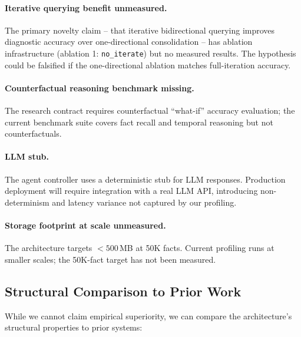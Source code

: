 \documentclass{article}
\begin{document}
\paragraph{Iterative querying benefit unmeasured.}
The primary novelty claim -- that iterative bidirectional querying improves
diagnostic accuracy over one-directional consolidation -- has ablation
infrastructure (ablation 1: \texttt{no\_iterate}) but no measured results. The
hypothesis could be falsified if the one-directional ablation matches full-iteration
accuracy.

\paragraph{Counterfactual reasoning benchmark missing.}
The research contract requires counterfactual ``what-if'' accuracy evaluation; the
current benchmark suite covers fact recall and temporal reasoning but not
counterfactuals.

\paragraph{LLM stub.}
The agent controller uses a deterministic stub for LLM responses. Production
deployment will require integration with a real LLM API, introducing non-
determinism and latency variance not captured by our profiling.

\paragraph{Storage footprint at scale unmeasured.}
The architecture targets $< 500$\,MB at 50K facts. Current profiling runs at
smaller scales; the 50K-fact target has not been measured.

\subsection{Structural Comparison to Prior Work}

While we cannot claim empirical superiority, we can compare the architecture's
structural properties to prior systems:
\end{document}

